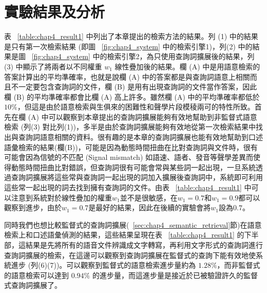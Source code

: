 \section{實驗結果及分析}
表 ~\ref{table:chap4_result1} 中列出了本章提出的檢索方法的結果。列 (1) 中的結果是只有第一次檢索結果 (即圖 ~\ref{fig:chap4_system} 中的檢索引擎1)，列(2) 中的結果是圖 ~\ref{fig:chap4_system} 中的檢索引擎2，為只使用查詢詞擴展後的結果，列 (3) 中顯示了將兩者以不同權重 $w_1$ 線性疊加後的結果。欄 (A) 中是用語意檢索的答案計算出的平均準確率，也就是說欄 (A) 中的答案都是與查詢詞語意上相關而且不一定要包含查詢詞的文件，欄 (B)
是用有出現查詢詞的文件當作答案，因此欄 (B) 的平均準確率都會比欄 (A) 高上許多。雖然欄 (A) 中的平均準確率都低於 $ 10\% $，但這是由於語意檢索與生俱來的困難性和聲學片段模稜兩可的特性所致。首先在欄 (A) 中可以觀察到本章提出的查詢詞擴展能夠有效地幫助到非監督式語意檢索 (列(3)
對比列(1))，多半是由於查詢詞擴展能夠有效地從第一次檢索結果中找出與查詢詞語意相關的資料。很有趣的是本章的查詢詞擴展也能有效地幫助到口述語彙檢索的結果(欄(B))，可能是因為動態時間扭曲在比對查詢詞與文件時，很有可能會因為信號的不匹配 (Signal mismatch)
如語速、語者、發音等聲學差異而使得動態時間扭曲比對錯誤，但查詢詞很有可能會常與某些詞一起出現，一旦系統透過查詢詞擴展將這些常與查詢詞一起出現的詞加入擴展後查詢詞中，系統即可利用這些常一起出現的詞去找到擁有查詢詞的文件。由表 ~\ref{table:chap4_result1} 中可以注意到系統對於線性疊加的權重$w_1$並不是很敏感，在$w_1=0.7$和$w_1=0.9$都可以觀察到進步，由於$w_1=0.7$是最好的結果，因此在後續的實驗會將$w_1$設為$0.7$。

同時我們也想比較監督式的查詢詞擴展(~\ref{sec:chap4_semantic_retrieval}節)在語意檢索上和口述語彙偵測的結果，這些結果呈現在表 ~\ref{table:chap4_result1} 的下半部，這結果是先將所有的語音文件辨識成文字轉寫，再利用文字形式的查詢詞進行查詢詞擴展的檢索，在這邊可以觀察到查詢詞擴展在監督式的查詢下能有效地使系統進步 (列(6)(7))。可以觀察到監督式的語意檢索進步量約為 $1.28\%$，而非監督式的語意檢索可以達到 $0.94\%$ 的進步量，而這進步量是接近於已被驗證許久的監督式查詢詞擴展了。

